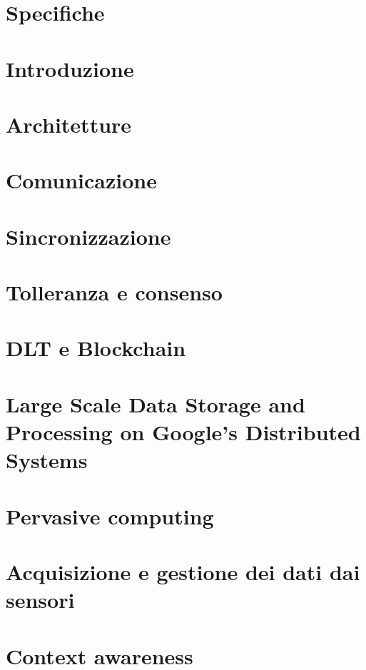 
\chapter*{Specifiche}


\chapter{Introduzione}

\chapter{Architetture}

\chapter{Comunicazione}

\chapter{Sincronizzazione}

\chapter{Tolleranza e consenso}

\chapter{DLT e Blockchain}

\chapter{Large Scale Data Storage and Processing on Google's Distributed Systems}

\chapter{Pervasive computing}

\chapter{Acquisizione e gestione dei dati dai sensori}

\chapter{Context awareness}
